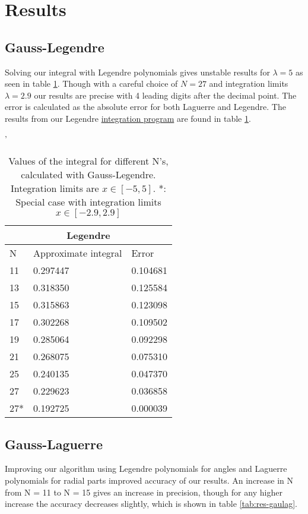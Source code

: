 \documentclass[../main.tex]{subfiles}
\begin{document}
\section{Results} \label{sec:results}
\subsection{Gauss-Legendre} \label{sec:QMGausslegresults}

Solving our integral with Legendre polynomials gives unstable results for $\lambda = 5$ as seen in table \ref{tab:res-gauleg}. Though with a careful choice of $N = 27$ and integration limits $\lambda = 2.9$ our results are precise with 4 leading digits after the decimal point. The error is calculated as the absolute error for both Laguerre and Legendre. The results from our Legendre \href{https://github.com/kmaasrud/Project-3/tree/master/code/Gauss-Quadrature}{integration program} are found in table \ref{tab:res-gauleg}.

\begin{table}[h!]'

\begin{center}
  \begin{tabular}{ |p{1cm}|p{4cm}|p{3cm}|}
 \hline
 \multicolumn{3}{|c|}{\textbf{Legendre}} \\
 \hline
       N   &Approximate integral & Error\\
 \hline
 11 & 0.297447 & 0.104681\\
 13 & 0.318350 & 0.125584\\
 15 & 0.315863 & 0.123098\\
 17 & 0.302268 & 0.109502\\
 19 & 0.285064 & 0.092298\\
 21 & 0.268075 & 0.075310\\
 25 & 0.240135 & 0.047370\\
 27 & 0.229623 & 0.036858\\
 27*& 0.192725 & 0.000039\\
 \hline
 \end{tabular}
 \caption{Values of the integral for different N's, calculated with Gauss-Legendre. Integration limits are $x\in[-5,5]$. *: Special case with integration limits $x\in[-2.9,2.9]$}
 \label{tab:res-gauleg}
 \end{center}
\end{table}


\subsection{Gauss-Laguerre} \label{sec:QMQMGausslagresults}
Improving our algorithm using Legendre polynomials for angles and Laguerre polynomials for radial parts improved accuracy of our results. An increase in N from N = 11 to N = 15 gives an increase in precision, though for any higher increase the accuracy decreases slightly, which is shown in table \ref{tab:res-gaulag}.
\end{document}
